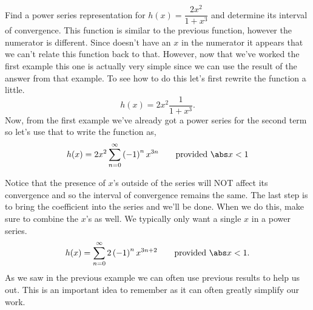 \begin{example}\label{ex_power_numerator}
Find a power series representation for $h(x)=\dfrac{2x^2}{1+x^3}$ and determine its interval of convergence.
\solution
This function is similar to the previous function, however the numerator is different.  Since  doesn't have an $x$ in the numerator it appears that we can't relate this function back to that.  However, now that we've worked the first example this one is actually very simple since we can use the result of the answer from that example.  To see how to do this let's first rewrite the function a little. 
\[h(x)=2x^2\frac1{1+x^3}.\]
Now, from the first example we've already got a power series for the second term so let's use that to write the function as, 
\[
h(x)=2x^2\sum_{n=0}^\infty\left( -1 \right)^n x^{3n} \qquad\text{provided }\abs x<1
\]

Notice that the presence of $x$'s outside of the series will NOT affect its convergence and so the interval of convergence remains the same.  
The last step is to bring the coefficient into the series and we'll be done.  When we do this, make sure to combine the $x$'s as well.  We typically only want a single $x$ in a power series.
\[
h(x)=\sum_{n=0}^\infty 2\left( -1 \right)^n x^{3n+2} \qquad\text{provided }\abs x<1.
\]
As we saw in the previous example we can often use previous results to help us out.  This is an important idea to remember as it can often greatly simplify our work.
\end{example}

